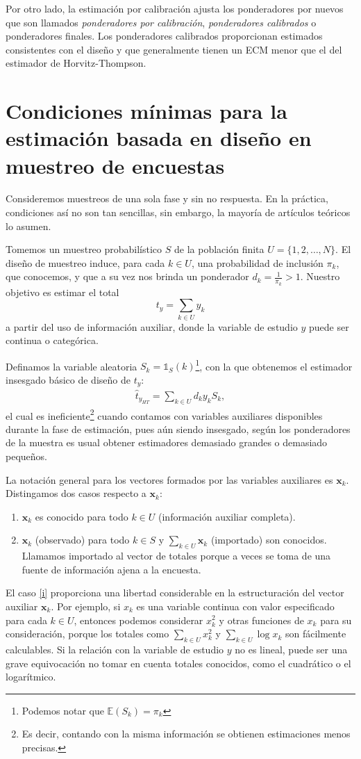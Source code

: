 \documentclass[a4paper,twoside,openright,12pt]{book}
\def\one{\mathds{1}}%
\theoremstyle{definition}
\numberwithin{equation}{chapter}
\numberwithin{figure}{chapter}
\numberwithin{table}{chapter}
\numberwithin{theorem}{chapter}
\numberwithin{lemma}{chapter}
\begin{document}
Por otro lado, la estimación por calibración ajusta los ponderadores por nuevos que son llamados \textsl{ponderadores por calibración}, \textsl{ponderadores calibrados} o ponderadores finales. Los ponderadores calibrados proporcionan estimados consistentes con el diseño y que generalmente tienen un ECM menor que el del estimador de Horvitz-Thompson.

\section{Condiciones mínimas para la estimación basada en diseño en muestreo de encuestas}\label{sec:1.1}
Consideremos muestreos de una sola fase y sin no respuesta. En la práctica, condiciones así no son tan sencillas, sin embargo, la mayoría de artículos teóricos lo asumen.

Tomemos un muestreo probabilístico $S$ de la población finita $U=\{1,2,\ldots,N\}$. El diseño de muestreo induce, para cada $k\in U$, una probabilidad de inclusión $\pi_k$, que conocemos, y que a su vez nos brinda un ponderador $d_k=\frac{1}{\pi_k}>1$.
Nuestro objetivo es estimar el total
$$t_y=\sum_{k\in U}y_k$$
a partir del uso de información auxiliar, donde la variable de estudio $y$ puede ser continua o categórica.

Definamos la variable aleatoria $S_k=\one_{S}(k)$\footnote{Podemos notar que $\mathbb E(S_k)=\pi_k$}, con la que obtenemos el estimador insesgado básico de diseño de $t_y$:
\begin{align}\label{eq:3.1}
	\hat{t}_{y_{HT}}=\sum_{k\in U} d_k y_kS_k,
\end{align}
el cual es ineficiente\footnote{Es decir, contando con la misma información se obtienen estimaciones menos precisas.} cuando contamos con variables auxiliares disponibles durante la fase de estimación, pues aún siendo insesgado, según los ponderadores de la muestra es usual obtener estimadores demasiado grandes o demasiado pequeños.

La notación general para los vectores formados por las variables auxiliares es $\mathbf{x}_k$. Distingamos dos casos respecto a $\mathbf{x}_k$:
\begin{enumerate}[label=\roman*]
	\item \label{i}$\mathbf{x}_k$ es conocido para todo $k\in U$ (información auxiliar completa).
	\item $\mathbf{x}_k$ (observado) para todo $k\in S$ y $\sum_{k\in U} \mathbf{x}_k$ (importado) son conocidos. Llamamos importado al vector de totales porque a veces se toma de una fuente de información ajena a la encuesta.
\end{enumerate}
El caso \ref{i} proporciona una libertad considerable en la estructuración del vector auxiliar $\mathbf{x}_k$. Por ejemplo, si $x_k$ es una variable continua con valor especificado para cada $k\in U$, entonces podemos considerar $x_k^2$ y otras funciones de $x_k$ para su consideración, porque los totales como $\sum_{k\in U} x_k^2$ y $\sum_{k\in U} \log x_k$ son fácilmente calculables. Si la relación con la variable de estudio $y$ no es lineal, puede ser una grave equivocación no tomar en cuenta totales conocidos, como el cuadrático o el logarítmico.
\end{document}
